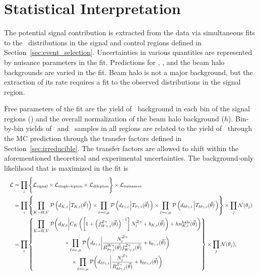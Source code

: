 \section{Statistical Interpretation}
\label{sec:interpretation}

The potential signal contribution is extracted from the data via simultaneous fits to the
\ETg\ distributions in the signal and control regions defined in Section~\ref{sec:event_selection}. 
Uncertainties in various quantities are represented by nuisance parameters in the fit. 
Predictions for \zinvg, \wlng, and the beam halo backgrounds are varied in the fit. 
Beam halo is not a major background, but the extraction of its rate requires a fit to the observed distributions in the signal region.

Free parameters of the fit are the yield of \zinvg\ background in each bin of the signal regions (\NZg[i]) and the overall normalization of the beam halo background ($h$). 
Bin-by-bin yields of \wlng\ and \zllg\ samples in all regions are related to the yield of \zinvg\ through the MC prediction through the transfer factors defined in Section~\ref{sec:irreducible}. 
The transfer factors are allowed to shift within the aforementioned theoretical and experimental uncertainties.
The background-only likelihood that is maximized in the fit is
\begin{equation}
  \resizebox{\textwidth}{!}{$
    \begin{aligned}
      \mathcal{L} & = \prod_{i} \Bigg\{ \mathcal{L_{\text{signal}}} \times \mathcal{L_{\text{single-lepton}}} \times \mathcal{L_{\text{dilepton}}} \Bigg\} \times \mathcal{L_{\text{nuisances}}} \\
      & = \prod_{i} \left\{
      \prod_{K=H,V} \mathcal{P}\left( d_{K, i} \left| \TK[,i] (\vec{\theta} \right.) \right) \times \prod_{\ell=\Pe,\Pgm} \mathcal{P}\left( d_{\ell\Pgg, i} \left| \Tl[,i] (\vec{\theta}) \right. \right)
      \times \prod_{\ell=\Pe,\Pgm} \mathcal{P}\left( d_{\ell\ell\Pgg, i} \left| \Tll[,i] (\vec{\theta}) \right. \right)
      \right\}  \times \prod_{j} \mathcal{N}(\theta_j) \\
      & = \prod_{i} \left\{
      \begin{gathered}
        \prod\limits_{K=H,V} \mathcal{P}\biggl( d_{K, i} \biggl| C_{K} \left( \left[1 + \left(\fZW[,i](\vec{\theta})\right)^{-1}\right] \NZg[i] + b_{K, i}(\vec{\theta}) \right) + h \nhalo[,i](\vec{\theta}) \biggr. \biggr) \\
        \times \prod\limits_{\ell=\Pe,\Pgm} \mathcal{P}\biggl( d_{\ell\Pgg, i} \biggl| \frac{\NZg[i]}{\RWl[,i](\vec{\theta}) \fZW[,i] (\vec{\theta})} + b_{\ell\Pgg, i}(\vec{\theta}) \biggr. \biggr) \\
        \times \prod\limits_{\ell=\Pe,\Pgm} \mathcal{P}\biggl( d_{\ell\ell\Pgg, i} \biggl| \frac{\NZg[i]}{\RZll[,i](\vec{\theta})} + b_{\ell\ell\Pgg, i}(\vec{\theta}) \biggr. \biggr)
      \end{gathered} \right\}
      \times \prod_{j} \mathcal{N}(\theta_j),
    \end{aligned}
  $}
\end{equation}
